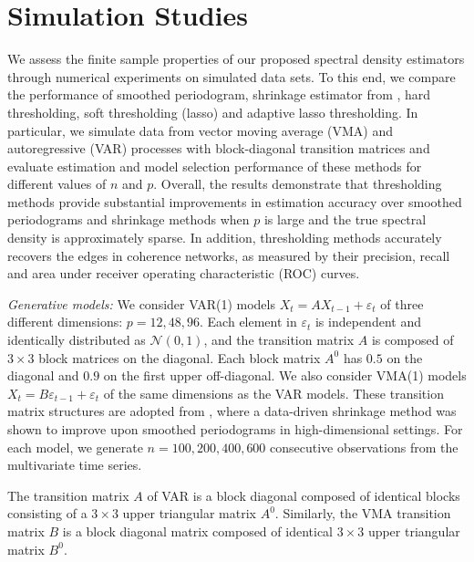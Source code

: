 \section{Simulation Studies}\label{sec:simulation}
We assess the finite sample properties of our proposed spectral density estimators through numerical experiments on simulated data sets. To this end, we compare the performance of smoothed periodogram, shrinkage estimator from \cite{bohm2009shrinkage},  hard thresholding, soft thresholding (lasso) and adaptive lasso thresholding. In particular, we simulate data from vector moving average (VMA) and autoregressive (VAR) processes with block-diagonal transition matrices and evaluate estimation and model selection performance of these methods for different values of $n$ and $p$. Overall, the results demonstrate that thresholding methods provide substantial improvements in estimation accuracy over smoothed periodograms and shrinkage methods when $p$ is large and the true spectral density is approximately sparse. In addition, thresholding methods accurately recovers the edges in coherence networks, as measured by their precision, recall and area under receiver operating characteristic (ROC)  curves. 

\textit{Generative models: } { We consider VAR(1) models $X_t = A X_{t-1} + \varepsilon_t$  of three different dimensions: $p =12, 48, 96$. Each element in $\varepsilon_t$ is independent and identically distributed as $\mathcal{N}(0,1)$, and the transition matrix $A$ is composed of $3 \times 3$ block matrices on the diagonal. Each block matrix $A^0$ has $0.5$ on the diagonal and $0.9$ on the first upper off-diagonal. We also consider VMA(1) models $X_t = B \varepsilon_{t-1}+\varepsilon_t$ of the same dimensions as the VAR models. These transition matrix structures are adopted from \citet{fiecas2014datadriven}, where a data-driven shrinkage method was shown to improve upon smoothed periodograms in high-dimensional settings. For each model, we generate $n =100, 200, 400, 600$ consecutive observations from the multivariate time series.}


The transition matrix $A$ of VAR is a block diagonal composed of identical blocks consisting of a $3 \times 3$ upper triangular matrix $A^0$. 
Similarly, the VMA transition matrix $B$ is a block diagonal matrix composed of identical $3 \times 3$ upper triangular matrix $B^0$.

